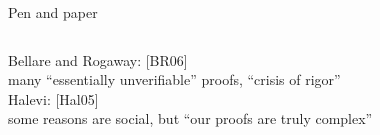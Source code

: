 \begin{frame}{Pen and paper}
\begin{columns}[c]
\begin{column}{.68\linewidth}
      Bellare and Rogaway: [BR06]\\
      \hspace{1.618em} many “essentially unverifiable” proofs, “crisis of rigor”\\[1.5em]

      Halevi: [Hal05]\\
      \hspace{1.618em} some reasons are social, but “our proofs are truly complex”\\[1.5em]



    \end{column}
  \end{columns}
\end{frame}




